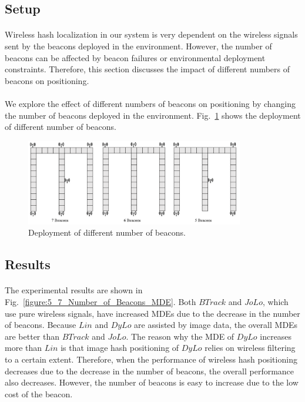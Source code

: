 \documentclass[a4paper,12pt]{report}
\begin{document}
\subsection{Setup}

\paragraph{}
Wireless hash localization in our system is very dependent on the wireless signals sent by the beacons deployed in the environment. However, the number of beacons can be affected by beacon failures or environmental deployment constraints. Therefore, this section discusses the impact of different numbers of beacons on positioning. 

\paragraph{}
We explore the effect of different numbers of beacons on positioning by changing the number of beacons deployed in the environment. Fig.~\ref{figure:5_7_Number_of_Beacons_Setup} shows the deployment of different number of beacons.

\begin{figure}[tbph]
    \begin{center}
    \includegraphics[width=0.85\textwidth]{images/5_7_Number_of_Beacons_Setup.png}
    \caption{Deployment of different number of beacons.}
    \label{figure:5_7_Number_of_Beacons_Setup}
    \end{center}
\end{figure}

\subsection{Results}

\paragraph{}
The experimental results are shown in Fig.~\ref{figure:5_7_Number_of_Beacons_MDE}. Both $BTrack$ and $JoLo$, which use pure wireless signals, have increased MDEs due to the decrease in the number of beacons. Because $Lin$ and $DyLo$ are assisted by image data, the overall MDEs are better than $BTrack$ and $JoLo$. The reason why the MDE of $DyLo$ increases more than $Lin$ is that image hash positioning of $DyLo$ relies on wireless filtering to a certain extent. Therefore, when the performance of wireless hash positioning decreases due to the decrease in the number of beacons, the overall performance also decreases. However, the number of beacons is easy to increase due to the low cost of the beacon.
\end{document}
